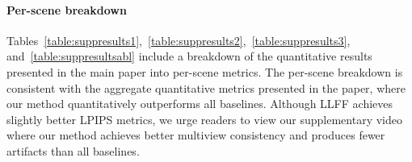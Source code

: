 \documentclass[runningheads]{llncs}
\begin{document}
\paragraph{\textbf{Per-scene breakdown}}
Tables~\ref{table:suppresults1},~\ref{table:suppresults2},~\ref{table:suppresults3}, and~\ref{table:suppresultsabl} include a breakdown of the quantitative results presented in the main paper into per-scene metrics. The per-scene breakdown is consistent with the aggregate quantitative metrics presented in the paper, where our method quantitatively outperforms all baselines. Although LLFF achieves slightly better LPIPS metrics, we urge readers to view our supplementary video where our method achieves better multiview consistency and produces fewer artifacts than all baselines. 




\newcommand{\suppresultsfigwidth}{1.14in}
\newcommand{\suppresultscropwidth}{0.69in}

\newcommand{\cropgreek}[1]{
  \makecell{
  \texttt{[image: \#1]} \\
  \texttt{[image: \#1]}
  }
}


\newcommand{\cropcube}[1]{
  \makecell{
  \texttt{[image: \#1]} \\
  \texttt{[image: \#1]} 
  }
}
\end{document}
